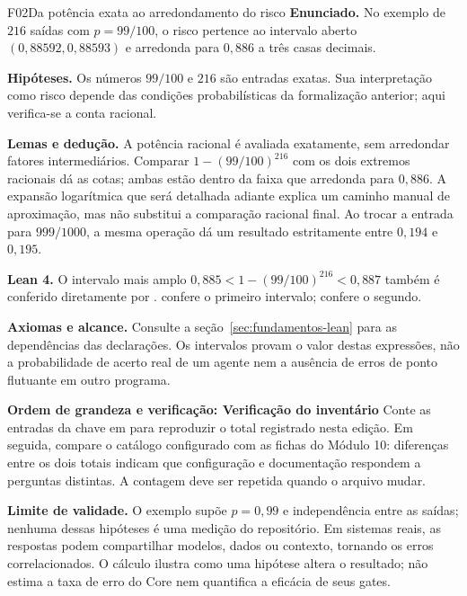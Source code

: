 \begin{formalizacao}{F02}{Da potência exata ao arredondamento do risco}
\textbf{Enunciado.} No exemplo de $216$ saídas com $p=99/100$, o risco pertence ao intervalo aberto $(0{,}88592,0{,}88593)$ e arredonda para $0{,}886$ a três casas decimais.

\textbf{Hipóteses.} Os números $99/100$ e $216$ são entradas exatas. Sua interpretação como risco depende das condições probabilísticas da formalização anterior; aqui verifica-se a conta racional.

\textbf{Lemas e dedução.} A potência racional é avaliada exatamente, sem arredondar fatores intermediários. Comparar $1-(99/100)^{216}$ com os dois extremos racionais dá as cotas; ambas estão dentro da faixa que arredonda para $0{,}886$. A expansão logarítmica que será detalhada adiante explica um caminho manual de aproximação, mas não substitui a comparação racional final. Ao trocar a entrada para $999/1000$, a mesma operação dá um resultado estritamente entre $0{,}194$ e $0{,}195$.

\textbf{Lean 4.} O intervalo mais amplo $0{,}885<1-(99/100)^{216}<0{,}887$ também é conferido diretamente por .   confere o primeiro intervalo;  confere o segundo.

\textbf{Axiomas e alcance.} Consulte a seção~\ref{sec:fundamentos-lean} para as dependências das declarações. Os intervalos provam o valor destas expressões, não a probabilidade de acerto real de um agente nem a ausência de erros de ponto flutuante em outro programa.
\end{formalizacao}

\begin{resultado}
\textbf{Ordem de grandeza e verificação: Verificação do inventário} Conte as entradas da chave  em
 para reproduzir o total registrado nesta edição. Em seguida,
compare o catálogo configurado com as fichas do Módulo 10: diferenças entre os
dois totais indicam que configuração e documentação respondem a perguntas
distintas. A contagem deve ser repetida quando o arquivo mudar.
\end{resultado}

\begin{aviso}
\textbf{Limite de validade.} O exemplo supõe $p=0{,}99$ e independência entre as
saídas; nenhuma dessas hipóteses é uma medição do repositório. Em sistemas reais,
as respostas podem compartilhar modelos, dados ou contexto, tornando os erros
correlacionados. O cálculo ilustra como uma hipótese altera o resultado; não estima
a taxa de erro do Core nem quantifica a eficácia de seus gates.
\end{aviso}

